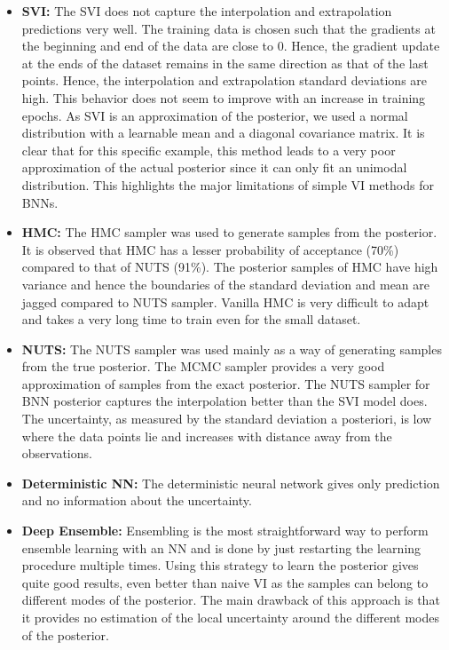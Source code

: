 \documentclass[11pt,a4paper]{article}
\begin{document}
\begin{itemize}
    \item \textbf{SVI:} The SVI does not capture the interpolation and extrapolation predictions very well. The training data is chosen such that the gradients at the beginning and end of the data are close to 0. Hence, the gradient update at the ends of the dataset remains  in the same direction as that of the last points. Hence, the interpolation and extrapolation standard deviations are high. This behavior does not seem to improve with an increase in training epochs.
    As SVI is an approximation of the posterior, we used a normal distribution with a learnable mean and a diagonal covariance matrix. It is clear that for this specific example, this method leads to a very poor approximation of the actual posterior since it can only fit an unimodal distribution. This highlights the major limitations of simple VI methods for BNNs.
    \item \textbf{HMC:} The HMC sampler was used to generate samples from the posterior. It is observed that HMC has a lesser probability of acceptance (70\%) compared to that of NUTS (91\%). The posterior samples of HMC have high variance and hence the boundaries of the standard deviation and mean are jagged compared to NUTS sampler. Vanilla HMC is very difficult to adapt and takes a very long time to train even for the small dataset.
    \item \textbf{NUTS:} The NUTS sampler was used mainly as a way of generating samples from the true posterior. The MCMC sampler provides a very good approximation of samples from the exact posterior. The NUTS sampler for BNN posterior captures the interpolation better than the SVI model does. The uncertainty, as measured by the standard deviation a posteriori, is low where the data points lie and increases with distance away from the observations.
    \item \textbf{Deterministic NN:} The deterministic neural network gives only prediction and no information about the uncertainty.
    \item \textbf{Deep Ensemble:} Ensembling is the most straightforward way to perform ensemble learning with an NN and is done by just restarting the learning procedure multiple times. Using this strategy to learn the posterior gives quite good results, even better than naive VI as the samples can belong to different modes of the posterior. The main drawback of this approach is that it provides no estimation of the local uncertainty around the different modes of the posterior.

\end{itemize}
\end{document}
